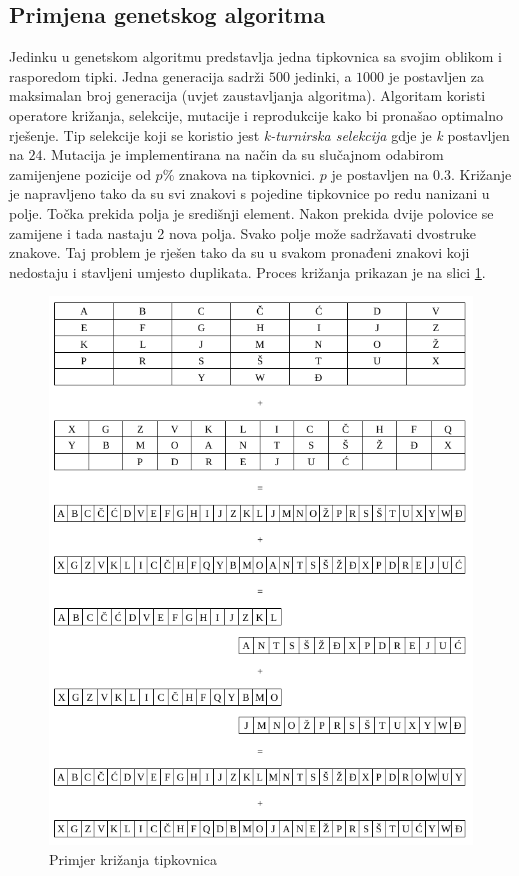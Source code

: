 \documentclass[times, utf8, zavrsni]{fer}
\begin{document}
\subsection{Primjena genetskog algoritma}
Jedinku u genetskom algoritmu predstavlja jedna tipkovnica sa svojim oblikom i rasporedom tipki. Jedna generacija sadrži $500$ jedinki, a $1000$ je postavljen za maksimalan broj generacija (uvjet zaustavljanja algoritma). Algoritam koristi operatore križanja, selekcije, mutacije i reprodukcije kako bi pronašao optimalno rješenje. Tip selekcije koji se koristio jest \emph{k-turnirska selekcija} gdje je \emph{k} postavljen na $24$. Mutacija je implementirana na način da su slučajnom odabirom zamijenjene pozicije od $p\%$ znakova na tipkovnici. $p$ je postavljen na $0.3$. Križanje je napravljeno tako da su svi znakovi s pojedine tipkovnice po redu nanizani u polje. Točka prekida polja je središnji element. Nakon prekida dvije polovice se zamijene i tada nastaju 2 nova polja. Svako polje može sadržavati dvostruke znakove. Taj problem je rješen tako da su u svakom pronađeni znakovi koji nedostaju i stavljeni umjesto duplikata. Proces križanja prikazan je na slici \ref{fig:krizanje_primjer}.

\begin{figure}[htb]
\centering
\includegraphics[width=16cm]{img/krizanje_tip.png}
\caption{Primjer križanja tipkovnica}
\label{fig:krizanje_primjer}
\end{figure}
\end{document}
